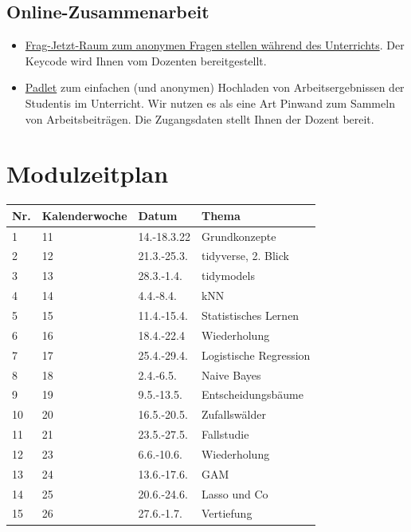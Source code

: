 \documentclass[
]{book}
\providecommand{\tightlist}{%
  \setlength{\itemsep}{0pt}\setlength{\parskip}{0pt}}
\begin{document}
\hypertarget{online-zusammenarbeit}{%
\subsection{Online-Zusammenarbeit}\label{online-zusammenarbeit}}

\begin{itemize}
\tightlist
\item
  \href{https://frag.jetzt/home}{Frag-Jetzt-Raum zum anonymen Fragen stellen während des Unterrichts}. Der Keycode wird Ihnen vom Dozenten bereitgestellt.
\item
  \href{https://de.padlet.com/}{Padlet} zum einfachen (und anonymen) Hochladen von Arbeitsergebnissen der Studentis im Unterricht. Wir nutzen es als eine Art Pinwand zum Sammeln von Arbeitsbeiträgen. Die Zugangsdaten stellt Ihnen der Dozent bereit.
\end{itemize}

\hypertarget{modulzeitplan}{%
\section{Modulzeitplan}\label{modulzeitplan}}

\begin{longtable}[]{@{}llll@{}}
\toprule
Nr. & Kalenderwoche & Datum & Thema \\
\midrule
\endhead
1 & 11 & 14.-18.3.22 & Grundkonzepte \\
2 & 12 & 21.3.-25.3. & tidyverse, 2. Blick \\
3 & 13 & 28.3.-1.4. & tidymodels \\
4 & 14 & 4.4.-8.4. & kNN \\
5 & 15 & 11.4.-15.4. & Statistisches Lernen \\
6 & 16 & 18.4.-22.4 & Wiederholung \\
7 & 17 & 25.4.-29.4. & Logistische Regression \\
8 & 18 & 2.4.-6.5. & Naive Bayes \\
9 & 19 & 9.5.-13.5. & Entscheidungsbäume \\
10 & 20 & 16.5.-20.5. & Zufallswälder \\
11 & 21 & 23.5.-27.5. & Fallstudie \\
12 & 23 & 6.6.-10.6. & Wiederholung \\
13 & 24 & 13.6.-17.6. & GAM \\
14 & 25 & 20.6.-24.6. & Lasso und Co \\
15 & 26 & 27.6.-1.7. & Vertiefung \\
\bottomrule
\end{longtable}
\end{document}
